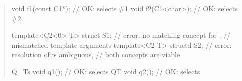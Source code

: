 \begin{quote}
\begin{codeblock}
void f1(const C1*); // OK:  selects \#1
void f2(C1<char>);  // OK:  selects \#2

template<C2<0> T> struct S1; // error: no matching concept for ,
                             // mismatched template arguments
template<C2 T> structd S2;   // error: resolution of  is ambiguous,
                             // both concepts are viable

Q{...Ts} void q1(); // OK: selects 
Q{T} void q2();     // OK: selects 
\end{codeblock}
\exitexample

\end{quote}
